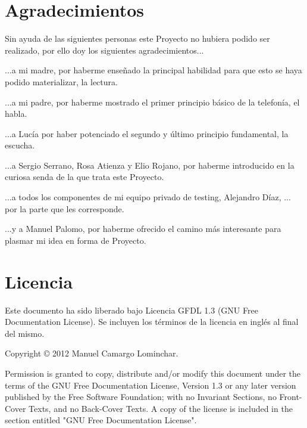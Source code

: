 
\section*{Agradecimientos}

Sin ayuda de las siguientes personas este Proyecto no hubiera podido ser realizado, por ello doy los siguientes agradecimientos...

...a mi madre, por haberme enseñado la principal habilidad para que esto se haya podido materializar, la lectura.

...a mi padre, por haberme mostrado el primer principio básico de la telefonía, el habla.

...a Lucía por haber potenciado el segundo y último principio fundamental, la escucha.

...a Sergio Serrano, Rosa Atienza y Elio Rojano, por haberme introducido en la curiosa senda de la que trata este Proyecto.

...a todos los componentes de mi equipo privado de testing, Alejandro Díaz, ... por la parte que les corresponde.

...y a Manuel Palomo, por haberme ofrecido el camino más interesante para plasmar mi idea en forma de Proyecto.

\cleardoublepage

\section*{Licencia}

Este documento ha sido liberado bajo Licencia GFDL 1.3 (GNU Free
Documentation License). Se incluyen los términos de la licencia en
inglés al final del mismo.

Copyright © 2012 Manuel Camargo Lominchar.

Permission is granted to copy, distribute and/or modify this document under the
terms of the GNU Free Documentation License, Version 1.3 or any later version
published by the Free Software Foundation; with no Invariant Sections, no
Front-Cover Texts, and no Back-Cover Texts. A copy of the license is included in
the section entitled "GNU Free Documentation License".

\cleardoublepage

